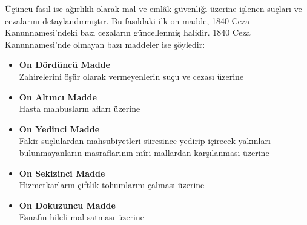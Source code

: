Üçüncü fasıl ise ağırlıklı olarak mal ve emlâk güvenliği üzerine işlenen suçları ve cezalarını detaylandırmıştır. Bu fasıldaki ilk on madde, 1840 Ceza Kanunnamesi'ndeki bazı cezaların güncellenmiş halidir. 1840 Ceza Kanunnamesi'nde olmayan bazı maddeler ise şöyledir:
\begin{itemize}
    \item \textbf{On Dördüncü Madde}\\
    Zahirelerini öşür olarak vermeyenlerin suçu ve cezası üzerine
    \item \textbf{On Altıncı Madde}\\
    Hasta mahbusların afları üzerine
    \item \textbf{On Yedinci Madde}\\
    Fakir suçlulardan mahsubiyetleri süresince yedirip içirecek yakınları bulunmayanların masraflarının mîri mallardan karşılanması üzerine
    \item \textbf{On Sekizinci Madde}\\
    Hizmetkarların çiftlik tohumlarını çalması üzerine
    \item \textbf{On Dokuzuncu Madde}\\
    Esnafın hileli mal satması üzerine
\end{itemize}
